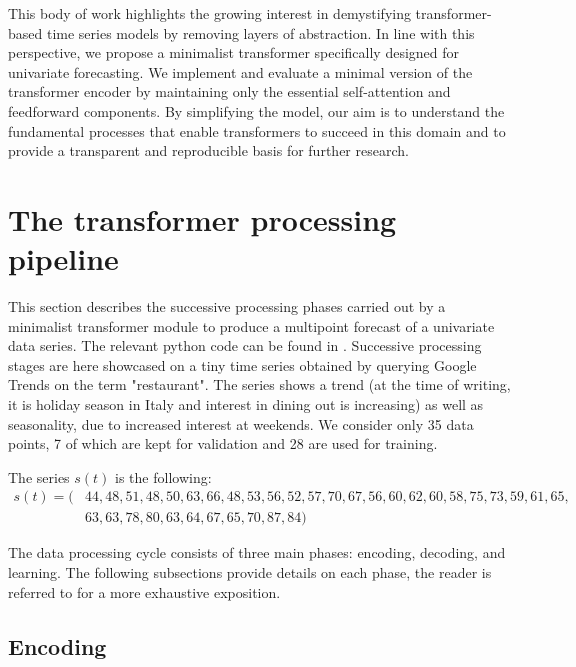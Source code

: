 \documentclass[algorithms,article,submit,pdftex,moreauthors]{Definitions/mdpi}
\begin{document}
This body of work highlights the growing interest in demystifying transformer-based time series models by removing layers of abstraction. In line with this perspective, we propose a minimalist transformer specifically designed for univariate forecasting. We implement and evaluate a minimal version of the transformer encoder by maintaining only the essential self-attention and feedforward components. By simplifying the model, our aim is to understand the fundamental processes that enable transformers to succeed in this domain and to provide a transparent and reproducible basis for further research.


\section{The transformer processing pipeline} \label{sec:transformer}

This section describes the successive processing phases carried out by a minimalist transformer module to produce a multipoint forecast of a univariate data series. The relevant python code can be found in \cite{G25}. Successive processing stages are here showcased on a tiny time series obtained by querying Google Trends \cite{googletrends2025} on the term "restaurant". The series shows a trend (at the time of writing, it is holiday season in Italy and interest in dining out is increasing) as well as seasonality, due to increased interest at weekends. We consider only 35 data points, 7 of which are kept for validation and 28 are used for training.

The series $s(t)$ is the following:
\begin{align}
s(t) = (& 44, 48, 51, 48, 50, 63, 66, 48, 53, 56, 52, 57, 70, 67, 56, 60, 62, 60, 58, 75, 73, 59, 61, 65,\nonumber\\
        & 63, 63, 78, 80, 63, 64, 67, 65, 70, 87, 84)\nonumber
\end{align}

The data processing cycle consists of three main phases: encoding, decoding, and learning. The following subsections provide details on each phase, the reader is referred to \cite{VSPU17} for a more exhaustive exposition.

\subsection{Encoding} \label{subsec:encoding}
\end{document}

